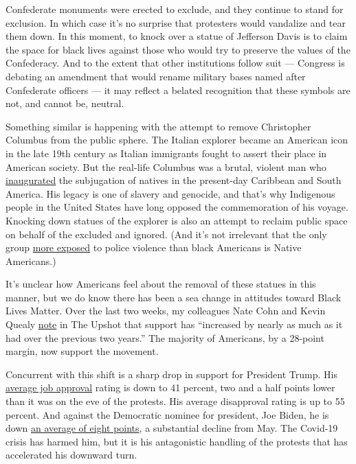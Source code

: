 Confederate monuments were erected to exclude, and they continue to
stand for exclusion. In which case it's no surprise that protesters
would vandalize and tear them down. In this moment, to knock over a
statue of Jefferson Davis is to claim the space for black lives against
those who would try to preserve the values of the Confederacy. And to
the extent that other institutions follow suit --- Congress is debating
an amendment that would rename military bases named after Confederate
officers --- it may reflect a belated recognition that these symbols are
not, and cannot be, neutral.

Something similar is happening with the attempt to remove Christopher
Columbus from the public sphere. The Italian explorer became an American
icon in the late 19th century as Italian immigrants fought to assert
their place in American society. But the real-life Columbus was a
brutal, violent man who
\href{https://www.washingtonpost.com/history/2019/10/14/here-are-indigenous-people-christopher-columbus-his-men-could-not-annihilate/}{inaugurated}
the subjugation of natives in the present-day Caribbean and South
America. His legacy is one of slavery and genocide, and that's why
Indigenous people in the United States have long opposed the
commemoration of his voyage. Knocking down statues of the explorer is
also an attempt to reclaim public space on behalf of the excluded and
ignored. (And it's not irrelevant that the only group
\href{https://www.urban.org/urban-wire/native-americans-deserve-more-attention-police-violence-conversation}{more
exposed} to police violence than black Americans is Native Americans.)

It's unclear how Americans feel about the removal of these statues in
this manner, but we do know there has been a sea change in attitudes
toward Black Lives Matter. Over the last two weeks, my colleagues Nate
Cohn and Kevin Quealy
\href{https://www.nytimes3xbfgragh.onion/interactive/2020/06/10/upshot/black-lives-matter-attitudes.html}{note}
in The Upshot that support has ``increased by nearly as much as it had
over the previous two years.'' The majority of Americans, by a 28-point
margin, now support the movement.

Concurrent with this shift is a sharp drop in support for President
Trump. His
\href{https://projects.fivethirtyeight.com/trump-approval-ratings/}{average
job approval} rating is down to 41 percent, two and a half points lower
than it was on the eve of the protests. His average disapproval rating
is up to 55 percent. And against the Democratic nominee for president,
Joe Biden, he is down
\href{https://www.realclearpolitics.com/epolls/2020/president/us/general_election_trump_vs_biden-6247.html}{an
average of eight points}, a substantial decline from May. The Covid-19
crisis has harmed him, but it is his antagonistic handling of the
protests that has accelerated his downward turn.


